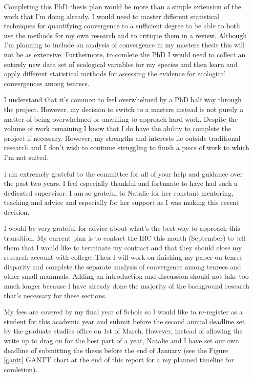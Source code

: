 \documentclass[12pt,a4paper]{article}
\begin{document}
	Completing this PhD thesis plan would be more than a simple extension of the work that I'm doing already. I would need to master different statistical techniques for quantifying convergence to a sufficient degree to be able to both use the methods for my own research and to critique them in a review. Although I'm planning to include an analysis of convergence in my masters thesis this will not be as extensive. Furthermore, to comlete the PhD I would need to collect an entirely new data set of ecological variables for my species and then learn and apply different statistical methods for assessing the evidence for ecological convergences among tenrecs.

	I understand that it's common to feel overwhelmed by a PhD half way through the project. However, my decision to switch to a masters instead is not purely a matter of being overwhelmed or unwilling to approach hard work. Despite the volume of work remaining I know that I do have the ability to complete the project if necessary. However, my strengths and interests lie outside traditional research and I don't wish to continue struggling to finish a piece of work to which I'm not suited.

	I am extremely grateful to the committee for all of your help and guidance over the past two years. I feel especially thankful and fortunate to have had such a dedicated supervisor: I am so grateful to Natalie for her constant mentoring, teaching and advice and especially for her support as I was making this recent decision.   

	I would be very grateful for advice about what's the best way to approach this transition. My current plan is to contact the IRC this month (September) to tell them that I would like to terminate my contract and that they should close my research account with college.  Then I will work on finishing my paper on tenrec disparity and complete the separate analysis of convergence among tenrecs and other small mammals. Adding an introduction and discussion should not take too much longer because I have already done the majority of the background research that's necessary for these sections.

	My fees are covered by my final year of Schols so I would like to re-register as a student for this academic year and submit before the second annual deadline set by the graduate studies office on 1st of March. However, instead of allowing the write up to drag on for the best part of a year, Natalie and I have set our own deadline of submitting the thesis before the end of January (see the Figure \ref{gantt} GANTT chart at the end of this report for a my planned timeline for comletion).
 
\end{document}
